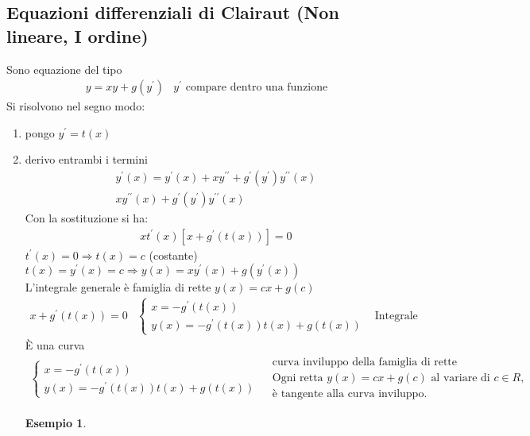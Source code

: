 \documentclass{book}
\newtheorem{esempio}{Esempio}
\begin{document}
\subsection{Equazioni differenziali di Clairaut (Non lineare, I ordine)}
Sono equazione del tipo
\begin{eqnarray*}
	y=xy+g(y^\prime) &y^\prime \text{ compare dentro una funzione}
\end{eqnarray*}
Si risolvono nel segno modo:
\begin{enumerate}
	\item pongo $y^\prime =t(x)$ 
	\item derivo entrambi i termini 
		\begin{eqnarray*}
			y^\prime(x)=y^\prime(x)+xy^{\prime\prime}+g^\prime (y^\prime)
			y^{\prime\prime}(x)\\
			xy^{\prime\prime}(x)+g^\prime(y^\prime)y^{\prime\prime}(x)
		\end{eqnarray*}
		Con la sostituzione si ha:
		\begin{eqnarray*}
			xt^\prime(x)[x+g^\prime(t(x))] =0
		\end{eqnarray*}
		$t^\prime(x)=0\Rightarrow t(x)=c$ (costante)
		$t(x)=y^\prime(x)=c\Rightarrow y(x)=xy^\prime(x)+g(y^\prime(x))$\\
		L'integrale generale è famiglia di rette $y(x)=cx+g(c)$
		\begin{eqnarray*}
			x+g^{\prime}(t(x))=0 & \begin{cases}
				x=-g^\prime(t(x))\\
				y(x)=-g^\prime(t(x))t(x)+g(t(x))
			\end{cases} & \text{Integrale singolare}
		\end{eqnarray*}
		È una curva
		\begin{eqnarray*}
			\begin{cases}
				x=-g^\prime(t(x))\\
				y(x)=-g^\prime(t(x))t(x)+g(t(x))
			\end{cases} & \begin{matrix}
                                        \text{curva inviluppo della famiglia di rette}\\
                                        \text{Ogni retta $y(x)=cx+g(c)$ al variare di $c\in R$,}\\
                                        \text{è tangente alla curva inviluppo.}
			\end{matrix}
		\end{eqnarray*}
                \begin{esempio}

\end{esempio}
\end{enumerate}
\end{document}

